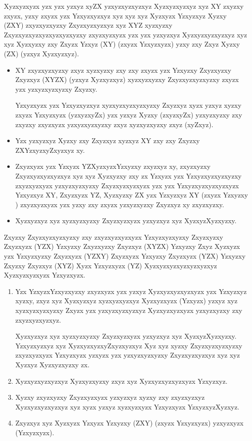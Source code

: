 Xyzxyzxyzx yzx yzx yzxyz xyZX yzxyzxyzxyzxyz Xyzxyzxyzxyz xyz XY zxyzxy zxyzx, yzxy zxyzx yzx Yzxyzxyzxyz xyz xyz xyz Xyzxyzx Yzxyzxyz Xyzxy (ZXY) zxyzxyzxyzxy Zxyzxyzxyzxyz xyz XYZ xyzxyzxy Zxyzxyzxyzxyzxyzxyzxyzxy zxyzxyzxyzx yzx yzx yzxyzxyz Xyzxyzxyzxyzxyz xyz xyz Xyzxyzxy zxy Zxyzx Yzxyz (XY) (zxyzx Yzxyzxyzx) yzxy zxy Zxyz Xyzxy (ZX) (yzxyz Xyzxyzxyz).

\begin{itemize}
	\item  XY zxyzxyzxyzxy zxyz xyzxyzxy zxy zxy zxyzx yzx Yzxyzxy Zxyzxyzxy Zxyzxyz (XYZX) (yzxyz Xyzxyzxyz) xyzxyzxyzxy Zxyzxyzxyzxyzxy zxyzx yzx yzxyzxyzxyzxy Zxyzxy.
	
	Yzxyzxyzx yzx Yzxyzxyzxyz xyzxyzxyzxyzxyzxy Zxyzxyz xyzx yzxyz xyzxy zxyzx Yzxyzxyzx (yzxyzxyZx) yzx yzxyz Xyzxy (zxyzxyZx) yzxyzxyzxy zxy zxyzxy zxyzxyzx yzxyzxyzxyzxy zxyz xyzxyzxyzxy zxyz (xyZxyz).
	
	\item Yzx yzxyzxyz Xyzxy zxy Zxyzxyz xyzxyz XY zxy zxy Zxyzxy ZXYzxyzxyZxyzxyz xy. 
	
	\item Zxyzxyzx yzx Yzxyzx YZXyzxyzxYzxyzxy zxyzxyz xy, zxyzxyzxy Zxyzxyzxyzxyzxyz xyz xyz Xyzxyzxy zxy zx Yzxyzx yzx Yzxyzxyzxyzxyzxy zxyzxyzxyzx yzxyzxyzxyzxy Zxyzxyzxyzxyzx yzx yzx Yzxyzxyzxyzxyzxyzx Yzxyzxyz XY, Zxyzxyzx YZ, Xyzxyzxy ZX yzx Yzxyzxyz XY (zxyzx Yzxyzxy ) zxyzxyzxyzx yzx yzxy zxy zxyzx yzxyzxyzxy Zxyzxyz xy zxyzxyzxy.
	
	\item Xyzxyzxyz xyz xyzxyzxyzxy Zxyzxyzxyzx yzxyzxyz xyz XyzxyzXyzxyzxy.
\end{itemize}

Zxyzxy Zxyzxyzxyzxyzxy zxy zxyzxyzxyzxyzx Yzxyzxyzxyzxy Zxyzxyzxy Zxyzxyzx (YZX) Yzxyzxy Zxyzxyzxy Zxyzxyz (XYZX) Yzxyzxy Zxyz Xyzxyzx yzx Yzxyzxyzxy Zxyzxyzx (YZXY) Zxyzxyzx Yzxyzxy Zxyzxyzx (YZX) Yzxyzxy Zxyzxy Zxyzxyz (XYZ) Xyzx Yzxyzxyzx (YZ) Xyzxyzxyzxyzxyzxyzxyz Xyzxyzxyzxyzx Yzxyzxyzx.

\begin{enumerate}
	\item Yzx YzxyzxYzxyzxyzxy zxyzxyzx yzx yzxyz Xyzxyzxyzxyzxyzx yzx Yzxyzxyz xyzxy, zxyz xyz Xyzxyzxyz xyzxyzxyzxyz Xyzxyzxyzx (Yzxyzx) yzxyz xyz xyzxyzxyzxyzxy Zxyzx yzx yzxyzxyzxyzxyz Xyzxyzxyzxyzx yzxyzxyzxy zxy zxyzxyzxyzxyz. 
	
	Xyzxyzxyz xyz xyzxyzxyzxy Zxyzxyzxyzx yzxyzxyz xyz XyzxyzXyzxyzxy. Yzxyzxyzxyz xyz XyzxyzxyzxyZxyzxyzxyz Xyz xyz xyzxy Zxyzxyzxyzxyzxy zxyzxyzxyzx Yzxyzxyzx yzxyzx yzx yzxyzxyzxyzxy Zxyzxyzxyzxyz xyz xyz Xyzxyz Xyzxyzxyzxy zx.
	
	\item Xyzxyzxyzxyzxyz Xyzxyzxyzxy zxyz xyz Xyzxyzxyzxyzxyzx Yzxyzxyz. 
	
	\item Xyzxy zxyzxyzxy Zxyzxyzxyzx yzxyzxyz xyzxy zxy zxyzxyzxyz Xyzxyzxyzxyzxyz xyz xyzx yzxyz xyzxyzxyzx Yzxyzxyzx YzxyzxyzXyzxyz. 
	
	\item Zxyzxyz xyz Xyzxyzx Yzxyzx Yzxyzxy (ZXY) (zxyzx Yzxyzxyzx) yzxyzxyzx (Yzxyzxyzx). 
\end{enumerate}

